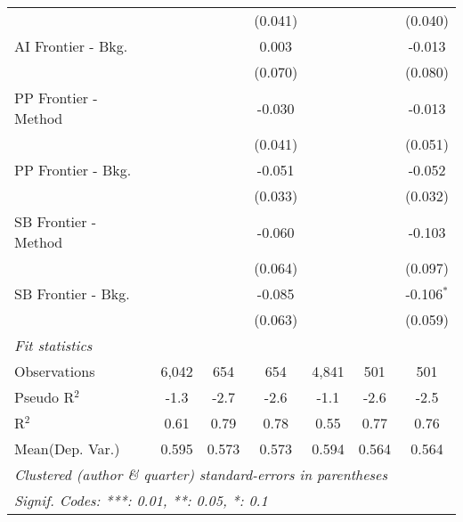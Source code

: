 \begin{tabular}{lcccccc}
                               &              &               & (0.041)     &              &               & (0.040)\\   
   AI Frontier - Bkg.          &              &               & 0.003       &              &               & -0.013\\   
                               &              &               & (0.070)     &              &               & (0.080)\\   
   PP Frontier - Method        &              &               & -0.030      &              &               & -0.013\\   
                               &              &               & (0.041)     &              &               & (0.051)\\   
   PP Frontier - Bkg.          &              &               & -0.051      &              &               & -0.052\\   
                               &              &               & (0.033)     &              &               & (0.032)\\   
   SB Frontier - Method        &              &               & -0.060      &              &               & -0.103\\   
                               &              &               & (0.064)     &              &               & (0.097)\\   
   SB Frontier - Bkg.          &              &               & -0.085      &              &               & -0.106$^{*}$\\   
                               &              &               & (0.063)     &              &               & (0.059)\\   
   \midrule
   \emph{Fit statistics}\\
   Observations                & 6,042        & 654           & 654         & 4,841        & 501           & 501\\  
   Pseudo R$^2$                & -1.3         & -2.7          & -2.6        & -1.1         & -2.6          & -2.5\\  
   R$^2$                       & 0.61         & 0.79          & 0.78        & 0.55         & 0.77          & 0.76\\  
Mean(Dep. Var.) & 0.595 & 0.573 & 0.573 & 0.594 & 0.564 & 0.564 \\
   \midrule \midrule
   \multicolumn{7}{l}{\emph{Clustered (author \& quarter) standard-errors in parentheses}}\\
   \multicolumn{7}{l}{\emph{Signif. Codes: ***: 0.01, **: 0.05, *: 0.1}}\\
\end{tabular}
\par\endgroup
